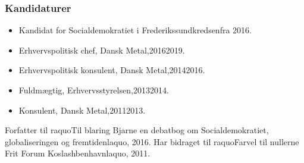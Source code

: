 \documentclass[11pt, a4paper]{awesome-cv}
\begin{document}
\begin{cvletter}
\subsubsection*{Kandidaturer}
\begin{itemize}
\item Kandidat for Socialdemokratiet i Frederikssundkredsenfra 2016.
\end{itemize}
\begin{itemize}
\item Erhvervspolitisk chef, Dansk Metal,20162019.
\item Erhvervspolitisk konsulent, Dansk Metal,20142016.
\item Fuldmægtig, Erhvervsstyrelsen,20132014.
\item Konsulent, Dansk Metal,20112013.
\end{itemize}
Forfatter til raquoTil blaring Bjarne  en debatbog om Socialdemokratiet, globaliseringen og fremtidenlaquo, 2016. Har bidraget til raquoFarvel til nullerne  Frit Forum Koslashbenhavnlaquo, 2011.

\end{cvletter}
\end{document}
